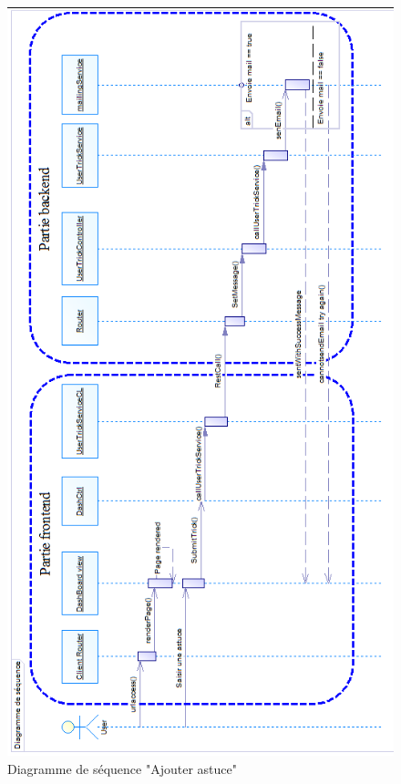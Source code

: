 \begin{figure}
	\begin{center}
		\includegraphics[height=\textheight]{figures/ds1}
	\end{center}
	\caption{Diagramme de séquence "Ajouter astuce"}
	\label{fig3.8}
\end{figure}

